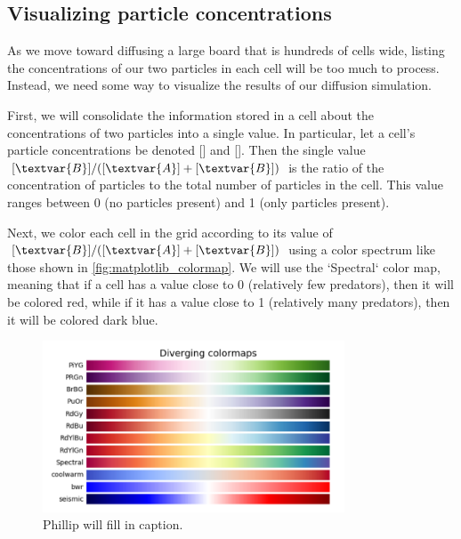 \begin{qbox}[%
Update the cells in \autoref{fig:two_particle_concentration_diffusion} after another generation of diffusion. Use the diffusion rates $d_A = 0.2$ and $d_B = 0.1$.
]\end{qbox}

\FloatBarrier
{}
\subsection{Visualizing particle concentrations}

As we move toward diffusing a large board that is hundreds of cells wide, listing the concentrations of our two particles in each cell will be too much to process. Instead, we need some way to visualize the results of our diffusion simulation.

First, we will consolidate the information stored in a cell about the concentrations of two particles into a single value. In particular, let a cell's particle concentrations be denoted [] and []. Then the single value $[\textvar{B}]/([\textvar{A}] + [\textvar{B}])$ is the ratio of the concentration of  particles to the total number of particles in the cell. This value ranges between 0 (no  particles present) and 1 (only  particles present).

Next, we color each cell in the grid according to its value of $[\textvar{B}]/([\textvar{A}] + [\textvar{B}])$ using a color spectrum like those shown in \autoref{fig:matplotlib_colormap}. We will use the `Spectral` color map, meaning that if a cell has a value close to 0 (relatively few predators), then it will be colored red, while if it has a value close to 1 (relatively many predators), then it will be colored dark blue.\\

\begin{figure}[h]
\centering
\mySfFamily
\includegraphics[width = 0.8\textwidth]{../images/matplotlib_colormap.png}
\caption{Phillip will fill in caption.}
\label{fig:matplotlib_colormap}
\end{figure}

